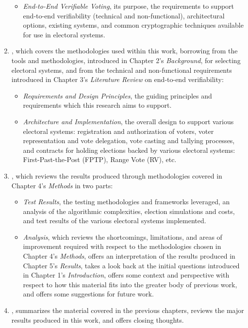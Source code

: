 \begin{enumerate}
\begin{itemize}
      \item \emph{End-to-End Verifiable Voting}, its purpose, the requirements
        to support end-to-end verifiability (technical and non-functional),
        architectural options, existing systems, and common cryptographic
        techniques available for use in electoral systems.
    \end{itemize}

  \item \emph{}, which covers the methodologies used
    within this work, borrowing from the tools and methodologies, introduced in
    Chapter 2's \emph{Background}, for selecting electoral systems, and from the
    technical and non-functional requirements introduced in Chapter 3's
    \emph{Literature Review} on end-to-end verifiability:

    \begin{itemize}
      \item \emph{Requirements and Design Principles}, the guiding principles
        and requirements which this research aims to support.

      \item \emph{Architecture and Implementation}, the overall design to
        support various electoral systems: registration and authorization of
        voters, voter representation and vote delegation, vote casting and
        tallying processes, and contracts for holding elections backed by
        various electoral systems: First-Past-the-Post (FPTP), Range Vote (RV),
        etc.
    \end{itemize}

  \item \emph{}, which reviews the results produced
    through methodologies covered in Chapter 4's \emph{Methods} in two parts:

    \begin{itemize}
      \item \emph{Test Results}, the testing methodologies and frameworks
        leveraged, an analysis of the algorithmic complexities, election
        simulations and costs, and test results of the various electoral systems
        implemented.

      \item \emph{Analysis}, which reviews the shortcomings, limitations, and
        areas of improvement required with respect to the methodologies chosen
        in Chapter 4's \emph{Methods}, offers an interpretation of the results
        produced in Chapter 5's \emph{Results}, takes a look back at the initial
        questions introduced in Chapter 1's \emph{Introduction}, offers some
        context and perspective with respect to how this material fits into the
        greater body of previous work, and offers some suggestions for future
        work.
    \end{itemize}

  \item \emph{}, summarizes the material covered in the
    previous chapters, reviews the major results produced in this work, and
    offers closing thoughts.
\end{enumerate}
